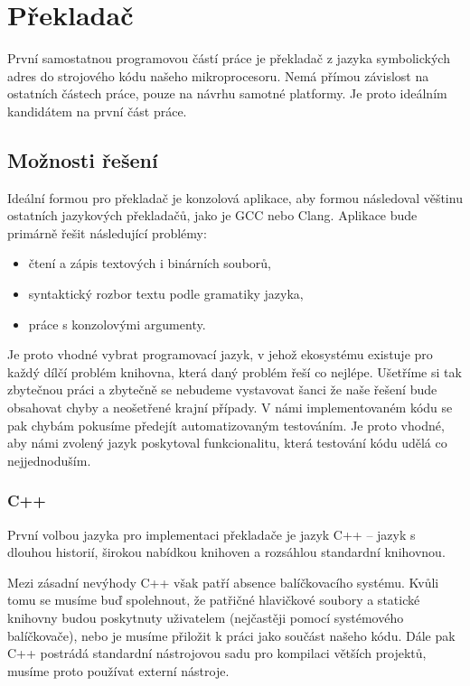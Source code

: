 \chapter{Překladač}
\label{chap:assembler}

První samostatnou programovou částí práce je překladač z jazyka symbolických adres do strojového kódu našeho mikroprocesoru. Nemá přímou závislost na ostatních částech práce, pouze na návrhu samotné platformy. Je proto ideálním kandidátem na první část práce.

\section{Možnosti řešení}

Ideální formou pro překladač je konzolová aplikace, aby formou následoval věštinu ostatních jazykových překladačů, jako je GCC nebo Clang. Aplikace bude primárně řešit následující problémy:

\begin{itemize}
	\item čtení a zápis textových i binárních souborů,
	\item syntaktický rozbor textu podle gramatiky jazyka,
	\item práce s konzolovými argumenty.
\end{itemize}

Je proto vhodné vybrat programovací jazyk, v jehož ekosystému existuje pro každý dílčí problém knihovna, která daný problém řeší co nejlépe. Ušetříme si tak zbytečnou práci a zbytečně se nebudeme vystavovat šanci že naše řešení bude obsahovat chyby a neošetřené krajní případy. V námi implementovaném kódu se pak chybám pokusíme předejít automatizovaným testováním. Je proto vhodné, aby námi zvolený jazyk poskytoval funkcionalitu, která testování kódu udělá co nejjednoduším.

\subsection{C++}
\label{sec:asm-cpp}

První volbou jazyka pro implementaci překladače je jazyk C++ -- jazyk s dlouhou historií\cite{cpp-history}, širokou nabídkou knihoven a rozsáhlou standardní knihovnou.

Mezi zásadní nevýhody C++ však patří absence balíčkovacího systému. Kvůli tomu se musíme buď spolehnout, že patřičné hlavičkové soubory a statické knihovny budou poskytnuty uživatelem (nejčastěji pomocí systémového balíčkovače), nebo je musíme přiložit k práci jako součást našeho kódu. Dále pak C++ postrádá standardní nástrojovou sadu pro kompilaci větších projektů, musíme proto používat externí nástroje.

